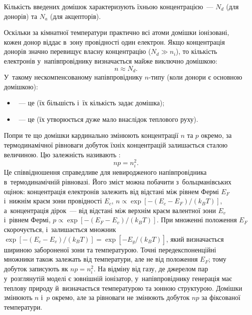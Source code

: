 Кількість введених домішок характеризують їхньою концентрацією~--- $N_d$ (для донорів) та
$N_a$ (для акцепторів).

Оскільки за кімнатної температури практично всі атоми домішки іонізовані, кожен донор
віддає в~зону провідності один електрон. Якщо концентрація донорів значно перевищує власну
концентрацію ($N_d \gg n_i$), то кількість електронів у~напівпровіднику визначається майже
виключно домішкою:
\begin{equation*}
	n \approx N_d.
\end{equation*}
У~такому нескомпенсованому напівпровіднику $n$-типу (коли донори є основною домішкою):
\begin{itemize}
	\item {}~--- це  (їх більшість і~їх кількість
	  задає домішка);
	\item {}~--- це  (їх утворюється дуже мало внаслідок
	  теплового руху).
\end{itemize}

Попри те що домішки кардинально змінюють концентрації $n$ та $p$ окремо, за
термодинамічної рівноваги добуток їхніх концентрацій залишається сталою величиною. Цю
залежність називають :
\begin{equation}\label{eq:MassAction}
	np = n_i^2.
\end{equation}
Це співвідношення справедливе для невиродженого напівпровідника в~термодинамічній
рівновазі. Його зміст можна побачити з~больцманівських оцінок: концентрація електронів
залежить від відстані між рівнем Фермі $E_F$ і~нижнім краєм зони провідності $E_c$,
$n\propto\exp[-(E_c-E_F)/(k_BT)]$, а~концентрація дірок~--- від відстані між верхнім краєм
валентної зони $E_v$ і~рівнем Фермі, $p\propto\exp[-(E_F-E_v)/(k_BT)]$. При множенні
положення $E_F$ скорочується, і~залишається множник $\exp[-(E_c-E_v)/(k_BT)]
=\exp[-E_g/(k_BT)]$, який визначається шириною забороненої зони та температурою.
Точні передекспоненційні множники також залежать від температури, але не від положення
$E_F$; тому добуток записують як $np=n_i^2$. На відміну від газу, де джерелом пар у~розглянутій
моделі є зовнішній іонізатор, у~напівпровіднику генерація має теплову природу й~визначається
температурою та зонною структурою. Домішки змінюють $n$ і~$p$ окремо, але за рівноваги
не змінюють добуток $np$ за фіксованої температури.



